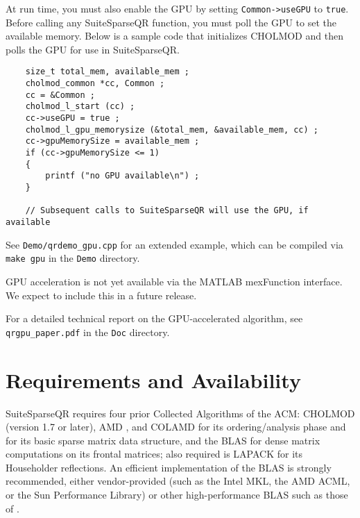 \documentclass[12pt]{article}
\begin{document}
At run time, you must also enable the GPU by setting \verb'Common->useGPU'
to \verb'true'.  Before calling any SuiteSparseQR function, you must
poll the GPU to set the available memory.  Below is a sample code
that initializes CHOLMOD and then polls the GPU for use in SuiteSparseQR.

\begin{verbatim}
    size_t total_mem, available_mem ;
    cholmod_common *cc, Common ;
    cc = &Common ;
    cholmod_l_start (cc) ;
    cc->useGPU = true ;
    cholmod_l_gpu_memorysize (&total_mem, &available_mem, cc) ;
    cc->gpuMemorySize = available_mem ;
    if (cc->gpuMemorySize <= 1)
    {
        printf ("no GPU available\n") ;
    }

    // Subsequent calls to SuiteSparseQR will use the GPU, if available
\end{verbatim}

See \verb'Demo/qrdemo_gpu.cpp' for an extended example, which can be
compiled via \verb'make gpu' in the \verb'Demo' directory.

GPU acceleration is not yet available via the MATLAB mexFunction interface.
We expect to include this in a future release.

For a detailed technical report on the GPU-accelerated algorithm,
see \verb'qrgpu_paper.pdf' in the \verb'Doc' directory.

\section{Requirements and Availability}
\label{summary}

SuiteSparseQR requires four prior Collected Algorithms of the ACM: CHOLMOD
\cite{ChenDavisHagerRajamanickam09,DavisHager09} (version 1.7 or later), AMD
\cite{AmestoyDavisDuff96,AmestoyDavisDuff03}, and COLAMD
\cite{DavisGilbertLarimoreNg00_algo,DavisGilbertLarimoreNg00} for its
ordering/analysis phase and for its basic sparse matrix data structure, and the
BLAS \cite{dddh:90} for dense matrix computations on its frontal matrices; also
required is LAPACK \cite{LAPACK} for its Householder reflections.  An efficient
implementation of the BLAS is strongly recommended, either vendor-provided
(such as the Intel MKL, the AMD ACML, or the Sun Performance Library) or other
high-performance BLAS such as those of \cite{GotoVanDeGeijn08}.
\end{document}

